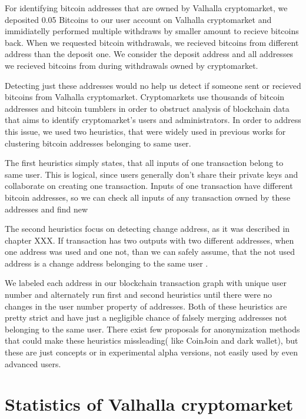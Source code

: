 \documentclass[
  digital, %
  table,   %
  lof,     %
  lot,     %
  oneside
]{fithesis3}
\begin{document}
For identifying bitcoin addresses that are owned by Valhalla cryptomarket, we 
deposited 0.05 Bitcoins to our user account on Valhalla cryptomarket and immidiatelly
performed multiple withdraws by smaller amount to recieve bitcoins back.
When we requested bitcoin withdrawals, we recieved bitcoins from different address
than the deposit one. We consider the deposit address and all addresses we recieved
bitcoins from during withdrawals owned by cryptomarket.

Detecting just these addresses would no help us detect
if someone sent or recieved bitcoins from Valhalla cryptomarket.
Cryptomarkets use thousands of bitcoin addresses and
bitcoin tumblers in order to obstruct analysis of blockchain data
that aims to identify cryptomarket's users and administrators.
In order to address this issue, we used two heuristics, that were widely used
in previous works \parencite{androulaki2013evaluating}\parencite{reid2013analysis}
for clustering bitcoin addresses belonging to same user.

The first heuristics simply states, that all inputs of one transaction belong to same user. This is logical,
since users generally don't share their private keys and collaborate on creating one transaction.
Inputs of one transaction have different bitcoin addresses, so we can check all inputs of any transaction
owned by these addresses and find new 

The second heuristics focus on detecting change address, as it was described in chapter XXX.
If transaction has two outputs with two different addresses, when one address was used and one not,
than we can safely assume, that the not used address is a change address belonging to the same user \parencite{androulaki2013evaluating}.

We labeled each address in our blockchain transaction graph with unique user number
and alternately run first and second heuristics until there were no changes in the user number property of addresses.
Both of these heuristics are pretty strict and have just a negligible chance of falsely merging
addresses not belonging to the same user.
There exist few proposals for anonymization methods that could make
these heuristics missleading( like CoinJoin and dark wallet), but
these are just concepts or in experimental alpha versions, not easily
used by even advanced users.

\chapter{Statistics of Valhalla cryptomarket}
\end{document}
